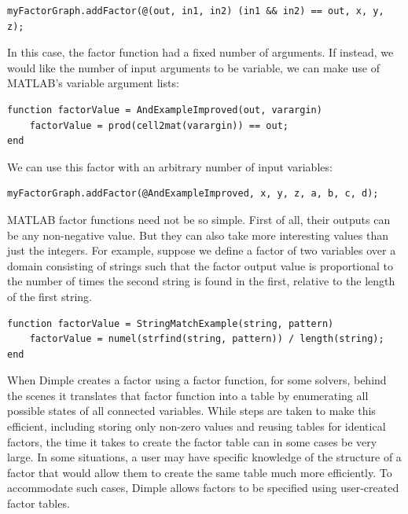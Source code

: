 \begin{lstlisting}
myFactorGraph.addFactor(@(out, in1, in2) (in1 && in2) == out, x, y, z);	
\end{lstlisting}

In this case, the factor function had a fixed number of arguments.  If instead, we would like the number of input arguments to be variable, we can make use of MATLAB's variable argument lists:

\begin{lstlisting}
function factorValue = AndExampleImproved(out, varargin)
    factorValue = prod(cell2mat(varargin)) == out;
end
\end{lstlisting}

We can use this factor with an arbitrary number of input variables:

\begin{lstlisting}
myFactorGraph.addFactor(@AndExampleImproved, x, y, z, a, b, c, d);	
\end{lstlisting}


MATLAB factor functions need not be so simple.  First of all, their outputs can be any non-negative value.  But they can also take more interesting values than just the integers.  For example, suppose we define a factor of two variables over a domain consisting of strings such that the factor output value is proportional to the number of times the second string is found in the first, relative to the length of the first string.

\begin{lstlisting}
function factorValue = StringMatchExample(string, pattern)
    factorValue = numel(strfind(string, pattern)) / length(string);
end
\end{lstlisting}

\fi


When Dimple creates a factor using a factor function, for some solvers, behind the scenes it translates that factor function into a table by enumerating all possible states of all connected variables.  While steps are taken to make this efficient, including storing only non-zero values and reusing tables for identical factors, the time it takes to create the factor table can in some cases be very large.  In some situations, a user may have specific knowledge of the structure of a factor that would allow them to create the same table much more efficiently.  To accommodate such cases, Dimple allows factors to be specified using user-created factor tables.

